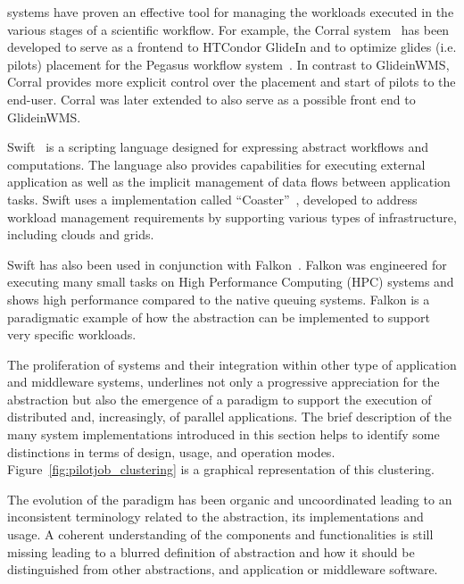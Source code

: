 \documentclass{sig-alternate}
\begin{document}



\pilotjob systems have proven an effective tool for managing the workloads
executed in the various stages of a scientific workflow. For example, the Corral
system~\cite{rynge2011experiences} has been developed to serve as a frontend to
HTCondor GlideIn and to optimize glides (i.e. pilots) placement for the Pegasus
workflow system~\cite{deelman2015}. In contrast to GlideinWMS, Corral provides
more explicit control over the placement and start of pilots to the end-user.
Corral was later extended to also serve as a possible front end to GlideinWMS.

Swift~\cite{wilde2011swift} is a scripting language designed for expressing
abstract workflows and computations. The language also provides capabilities for
executing external application as well as the implicit management of data flows
between application tasks. Swift uses a \pilot implementation called
``Coaster''~\cite{coasters_url}, developed to address workload management
requirements by supporting various types of infrastructure, including clouds and
grids.

Swift has also been used in conjunction with Falkon~\cite{raicu2007}. Falkon was
engineered for executing many small tasks on High Performance Computing (HPC)
systems and shows high performance compared to the native queuing systems.
Falkon is a paradigmatic example of how the \pilot abstraction can be
implemented to support very specific workloads.

The proliferation of \pilotjob systems and their integration within other type
of application and middleware systems, underlines not only a progressive
appreciation for the \pilot abstraction but also the emergence of a \pilot
paradigm to support the execution of distributed and, increasingly, of parallel
applications. The brief description of the many \pilotjob system implementations
introduced in this section helps to identify some distinctions in terms of
design, usage, and operation modes. Figure~\ref{fig:pilotjob_clustering} is a
graphical representation of this clustering.

The evolution of the \pilot paradigm has been organic and uncoordinated leading
to an inconsistent terminology related to the \pilot abstraction, its
implementations and usage. A coherent understanding of the \pilot components and
functionalities is still missing leading to a blurred definition of \pilot
abstraction and how it should be distinguished from other abstractions, and
application or middleware software.
\end{document}
